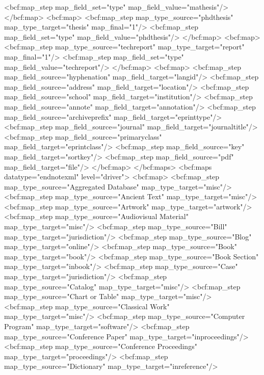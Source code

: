         <bcf:map_step map_field_set="type" map_field_value="mathesis"/>
      </bcf:map>
      <bcf:map>
        <bcf:map_step map_type_source="phdthesis" map_type_target="thesis" map_final="1"/>
        <bcf:map_step map_field_set="type" map_field_value="phdthesis"/>
      </bcf:map>
      <bcf:map>
        <bcf:map_step map_type_source="techreport" map_type_target="report" map_final="1"/>
        <bcf:map_step map_field_set="type" map_field_value="techreport"/>
      </bcf:map>
      <bcf:map>
        <bcf:map_step map_field_source="hyphenation" map_field_target="langid"/>
        <bcf:map_step map_field_source="address" map_field_target="location"/>
        <bcf:map_step map_field_source="school" map_field_target="institution"/>
        <bcf:map_step map_field_source="annote" map_field_target="annotation"/>
        <bcf:map_step map_field_source="archiveprefix" map_field_target="eprinttype"/>
        <bcf:map_step map_field_source="journal" map_field_target="journaltitle"/>
        <bcf:map_step map_field_source="primaryclass" map_field_target="eprintclass"/>
        <bcf:map_step map_field_source="key" map_field_target="sortkey"/>
        <bcf:map_step map_field_source="pdf" map_field_target="file"/>
      </bcf:map>
    </bcf:maps>
    <bcf:maps datatype="endnotexml" level="driver">
      <bcf:map>
        <bcf:map_step map_type_source="Aggregated Database" map_type_target="misc"/>
        <bcf:map_step map_type_source="Ancient Text" map_type_target="misc"/>
        <bcf:map_step map_type_source="Artwork" map_type_target="artwork"/>
        <bcf:map_step map_type_source="Audiovisual Material" map_type_target="misc"/>
        <bcf:map_step map_type_source="Bill" map_type_target="jurisdiction"/>
        <bcf:map_step map_type_source="Blog" map_type_target="online"/>
        <bcf:map_step map_type_source="Book" map_type_target="book"/>
        <bcf:map_step map_type_source="Book Section" map_type_target="inbook"/>
        <bcf:map_step map_type_source="Case" map_type_target="jurisdiction"/>
        <bcf:map_step map_type_source="Catalog" map_type_target="misc"/>
        <bcf:map_step map_type_source="Chart or Table" map_type_target="misc"/>
        <bcf:map_step map_type_source="Classical Work" map_type_target="misc"/>
        <bcf:map_step map_type_source="Computer Program" map_type_target="software"/>
        <bcf:map_step map_type_source="Conference Paper" map_type_target="inproceedings"/>
        <bcf:map_step map_type_source="Conference Proceedings" map_type_target="proceedings"/>
        <bcf:map_step map_type_source="Dictionary" map_type_target="inreference"/>
